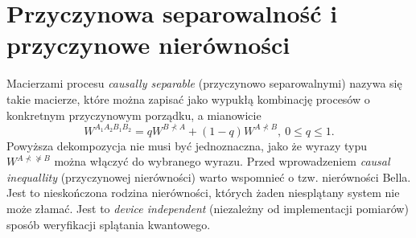 \documentclass[10pt]{article} %
\newcommand{\WAll}{W^{A_1A_2B_1B_2}}
\begin{document}
\section{Przyczynowa separowalność i przyczynowe nierówności}
Macierzami procesu \textit{causally separable} (przyczynowo separowalnymi) nazywa się takie macierze, które można zapisać jako wypukłą kombinację procesów o konkretnym przyczynowym porządku, a mianowicie
\begin{equation}
\label{eq:sep}
\WAll = qW^{B \nprec A} + (1-q)W^{A \nprec B},~0 \leq q \leq 1.
\end{equation}
Powyższa dekompozycja nie musi być jednoznaczna, jako że wyrazy typu $W^{A \nprec \nsucceq B}$ można włączyć do wybranego wyrazu.
Przed wprowadzeniem \textit{causal inequallity} (przyczynowej nierówności) warto wspomnieć o tzw. nierówności Bella. Jest to nieskończona rodzina nierówności, których żaden niesplątany system nie może złamać. Jest to \textit{device independent} (niezależny od implementacji pomiarów) sposób weryfikacji splątania kwantowego.
\end{document}
